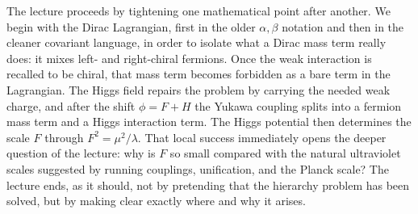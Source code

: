 The lecture proceeds by tightening one mathematical point after another. We begin with the Dirac Lagrangian, first in the older \(\alpha,\beta\) notation and then in the cleaner covariant language, in order to isolate what a Dirac mass term really does: it mixes left- and right-chiral fermions. Once the weak interaction is recalled to be chiral, that mass term becomes forbidden as a bare term in the Lagrangian. The Higgs field repairs the problem by carrying the needed weak charge, and after the shift \(\phi=F+H\) the Yukawa coupling splits into a fermion mass term and a Higgs interaction term. The Higgs potential then determines the scale \(F\) through \(F^2=\mu^2/\lambda\). That local success immediately opens the deeper question of the lecture: why is \(F\) so small compared with the natural ultraviolet scales suggested by running couplings, unification, and the Planck scale? The lecture ends, as it should, not by pretending that the hierarchy problem has been solved, but by making clear exactly where and why it arises.